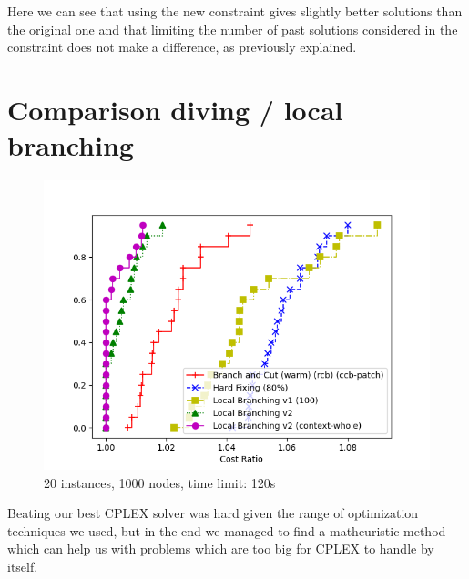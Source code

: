 Here we can see that using the new constraint gives slightly better solutions than the original one and that limiting the number of past solutions considered in the constraint does not make a difference, as previously explained.

\section{Comparison diving / local branching}

\begin{figure}[h]
    \centering
    \includegraphics*[width=.6\textwidth]{../plots/perfprof_mat_costs.png}
    \caption*{20 instances, 1000 nodes, time limit: 120s}
\end{figure}

Beating our best CPLEX solver was hard given the range of optimization techniques we used, but in the end we managed to find a matheuristic method which can help us with problems which are too big for CPLEX to handle by itself.
